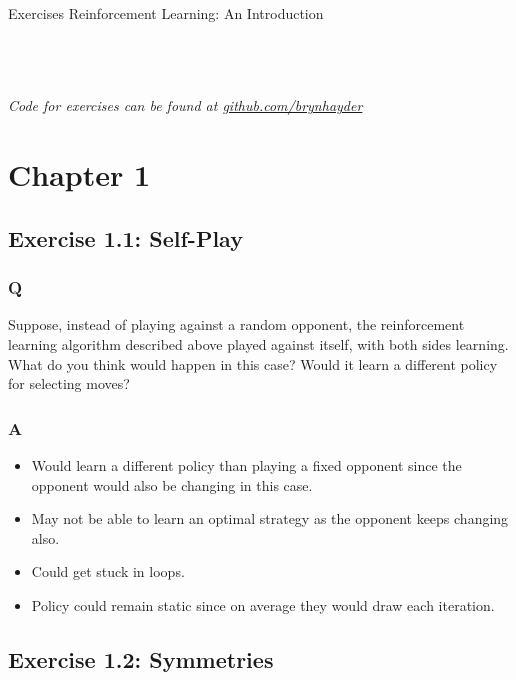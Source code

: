 \documentclass[a4paper, oneside, 11pt]{article}
\newcommand\Rule{\noindent\makebox[\textwidth]{\rule{\textwidth}{0.5pt}}}
\begin{document}
{\huge Exercises} \hfill {\huge Reinforcement Learning: An Introduction}\\
\Rule\\
\tableofcontents
\mbox{}\\
\Rule
\mbox{}\\


\setcounter{secnumdepth}{2}

\clearpage
\vfill
\begin{center}
    \emph{Code for exercises can be found at \href{https://github.com/brynhayder}{github.com/brynhayder}}
\end{center}
\vfill

\clearpage
\section{Chapter 1}
\subsection{Exercise 1.1: Self-Play}
\subsubsection{Q}
Suppose, instead of playing against a random opponent, the reinforcement learning algorithm described above played against itself, with both sides learning. What do you think would happen in this case? Would it learn a different policy for selecting moves?

\subsubsection{A}
\begin{itemize}
    \item Would learn a different policy than playing a fixed opponent since the opponent would also be changing in this case.
    \item May not be able to learn an optimal strategy as the opponent keeps changing also.
    \item Could get stuck in loops.
    \item Policy could remain static since on average they would draw each iteration.
\end{itemize}

\subsection{Exercise 1.2: Symmetries}
\end{document}
